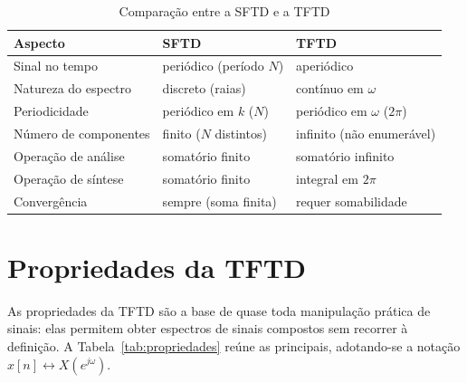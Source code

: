 \documentclass[
    12pt,
    openright,
    oneside,
    a4paper,
    chapter=TITLE,
    section=TITLE,
    brazil
]{abntex2}
\begin{document}
\begin{table}[H]
\centering
\caption{Comparação entre a SFTD e a TFTD}
\label{quad:comparacao}
\begin{tabular}{@{}lll@{}}
\toprule
\textbf{Aspecto} & \textbf{SFTD} & \textbf{TFTD} \\
\midrule
Sinal no tempo        & periódico (período $N$)   & aperiódico \\
Natureza do espectro  & discreto (raias)          & contínuo em $\omega$ \\
Periodicidade         & periódico em $k$ ($N$)    & periódico em $\omega$ ($2\pi$) \\
Número de componentes & finito ($N$ distintos)    & infinito (não enumerável) \\
Operação de análise   & somatório finito          & somatório infinito \\
Operação de síntese   & somatório finito          & integral em $2\pi$ \\
Convergência          & sempre (soma finita)      & requer somabilidade \\
\bottomrule
\end{tabular}
\end{table}

\chapter{Propriedades da TFTD}
\label{cap:propriedades}

As propriedades da TFTD são a base de quase toda manipulação prática de sinais: elas
permitem obter espectros de sinais compostos sem recorrer à definição. A
Tabela~\ref{tab:propriedades} reúne as principais, adotando-se a notação
$x[n] \longleftrightarrow X(e^{j\omega})$.
\end{document}
